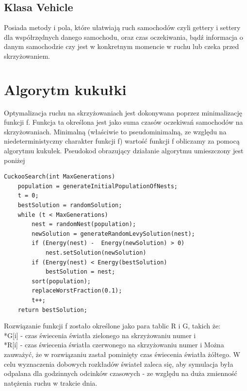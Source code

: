 \documentclass{article}
\begin{document}
\subsection{Klasa Vehicle}
    Posiada metody i pola, które ułatwiają ruch samochodów czyli gettery i settery dla współrzędnych danego samochodu, oraz czas oczekiwania, bądź informacja o danym samochodzie czy jest w konkretnym momencie w ruchu lub czeka przed skrzyżowaniem.
\section{Algorytm kukułki}
    Optymalizacja ruchu na skrzyżowaniach jest dokonywana poprzez minimalizację funkcji f. Funkcja ta określona jest jako suma czasów oczekiwań samochodów na skrzyżowaniach. Minimalną (właściwie to pseudominimalną, ze względu na niedeterministyczny charakter funkcji f) wartość funkcji f obliczamy za pomocą algorytmu kukułek. Pseudokod obrazujący działanie algorytmu umieszczony jest poniżej

\begin{lstlisting}
CuckooSearch(int MaxGenerations)
    population = generateInitialPopulationOfNests;
    t = 0;
    bestSolution = randomSolution;
    while (t < MaxGenerations)
        nest = randomNest(population);
        newSolution = generateRandomLevySolution(nest);
        if (Energy(nest) -  Energy(newSolution) > 0)
            nest.setSolution(newSolution)
        if (Energy(nest) < Energy(bestSolution)
            bestSolution = nest;
        sort(population);
        replaceWorstFraction(0.1);
        t++;
    return bestSolution;
\end{lstlisting}

Rozwiązanie funkcji f zostało określone jako para tablic R i G, takich że: 
\\*G[i]  - czas świecenia światła zielonego na skrzyżowaniu numer i
\\*R[i]  - czas świecenia światła czerwonego na skrzyżowaniu numer i
Można zauważyć, że w rozwiązaniu zastał pominięty czas świecenia światła żółtego.
W celu wyznaczenia dobowych rozkładów świateł zaleca się, aby symulacja była odpalana dla godzinnych odcinków czasowych - ze względu na duża zmienność natężenia ruchu w trakcie dnia. 
\end{document}
